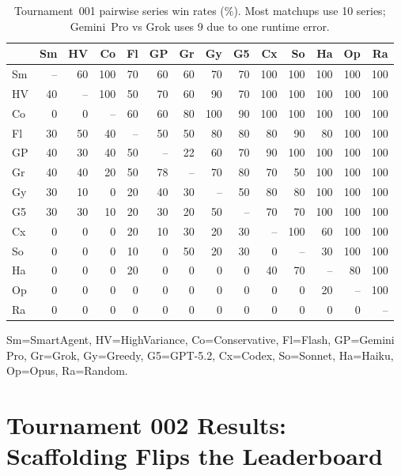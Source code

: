 \documentclass[11pt]{article}
\begin{document}
\begin{table}[t]
\centering
\footnotesize
\setlength{\tabcolsep}{2.5pt}
\renewcommand{\arraystretch}{1.05}
\caption{Tournament~001 pairwise series win rates (\%). Most matchups use 10 series; Gemini~Pro vs Grok uses 9 due to one runtime error.}
\label{tab:t1_matrix}
\begin{tabular}{lrrrrrrrrrrrrr}
\toprule
 & Sm & HV & Co & Fl & GP & Gr & Gy & G5 & Cx & So & Ha & Op & Ra \\
\midrule
Sm & -- & 60 & 100 & 70 & 60 & 60 & 70 & 70 & 100 & 100 & 100 & 100 & 100 \\
HV & 40 & -- & 100 & 50 & 70 & 60 & 90 & 70 & 100 & 100 & 100 & 100 & 100 \\
Co & 0 & 0 & -- & 60 & 60 & 80 & 100 & 90 & 100 & 100 & 100 & 100 & 100 \\
Fl & 30 & 50 & 40 & -- & 50 & 50 & 80 & 80 & 80 & 90 & 80 & 100 & 100 \\
GP & 40 & 30 & 40 & 50 & -- & 22 & 60 & 70 & 90 & 100 & 100 & 100 & 100 \\
Gr & 40 & 40 & 20 & 50 & 78 & -- & 70 & 80 & 70 & 50 & 100 & 100 & 100 \\
Gy & 30 & 10 & 0 & 20 & 40 & 30 & -- & 50 & 80 & 80 & 100 & 100 & 100 \\
G5 & 30 & 30 & 10 & 20 & 30 & 20 & 50 & -- & 70 & 70 & 100 & 100 & 100 \\
Cx & 0 & 0 & 0 & 20 & 10 & 30 & 20 & 30 & -- & 100 & 60 & 100 & 100 \\
So & 0 & 0 & 0 & 10 & 0 & 50 & 20 & 30 & 0 & -- & 30 & 100 & 100 \\
Ha & 0 & 0 & 0 & 20 & 0 & 0 & 0 & 0 & 40 & 70 & -- & 80 & 100 \\
Op & 0 & 0 & 0 & 0 & 0 & 0 & 0 & 0 & 0 & 0 & 20 & -- & 100 \\
Ra & 0 & 0 & 0 & 0 & 0 & 0 & 0 & 0 & 0 & 0 & 0 & 0 & -- \\
\bottomrule
\end{tabular}
\vspace{0.3em}
\noindent\footnotesize{Sm=SmartAgent, HV=HighVariance, Co=Conservative, Fl=Flash, GP=Gemini Pro, Gr=Grok, Gy=Greedy, G5=GPT-5.2, Cx=Codex, So=Sonnet, Ha=Haiku, Op=Opus, Ra=Random.}
\end{table}

\section{Tournament 002 Results: Scaffolding Flips the Leaderboard}
\end{document}
